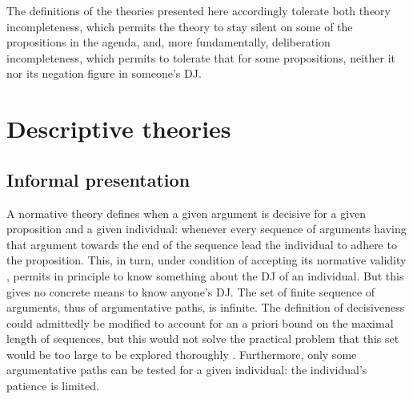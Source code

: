 \documentclass[version=last, pagesize, twoside=off, bibliography=totoc, DIV=calc, fontsize=12pt, a4paper, french, english]{scrartcl}
\begin{document}
The definitions of the theories presented here accordingly tolerate both theory incompleteness, which permits the theory to stay silent on some of the propositions in the agenda, and, more fundamentally, deliberation incompleteness, which permits to tolerate that for some propositions, neither it nor its negation figure in someone’s \ac{DJ}. 


\section{Descriptive theories}
\label{sec:descriptive}
\subsection{Informal presentation}
A normative theory defines when a given argument is decisive for a given proposition and a given individual: whenever every sequence of arguments having that argument towards the end of the sequence lead the individual to adhere to the proposition. This, in turn, under condition of accepting its normative validity , permits in principle to know something about the \ac{DJ} of an individual. But this gives no concrete means to know anyone’s \ac{DJ}. The set of finite sequence of arguments, thus of argumentative paths, is infinite. The definition of decisiveness could admittedly be modified to account for an a priori bound on the maximal length of sequences, but this would not solve the practical problem that this set would be too large to be explored thoroughly 
. 
Furthermore, only some argumentative paths can be tested for a given individual: the individual’s patience is limited. 
\end{document}
